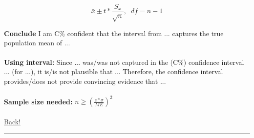 \documentclass[main]{subfiles}
\begin{document}
\[\bar{x} \pm t* \frac{S_x}{\sqrt{n}},\;\;df = n - 1\]

\noindent\textbf{Conclude}
I am C\% confident that the interval from ... captures the true population mean of ...
\\~\\
\noindent\textbf{Using interval:} Since ... was/was not captured in the (C\%) confidence interval ... (for ...), it is/is not plausible that ... Therefore, the confidence interval provides/does not provide convincing evidence that ...
\\~\\
\noindent\textbf{Sample size needed:} $n \geq (\frac{z*\sigma}{ME})^2$
\\~\\
\noindent\hyperlink{toc}{Back!}
\newline\hrule
\end{document}
